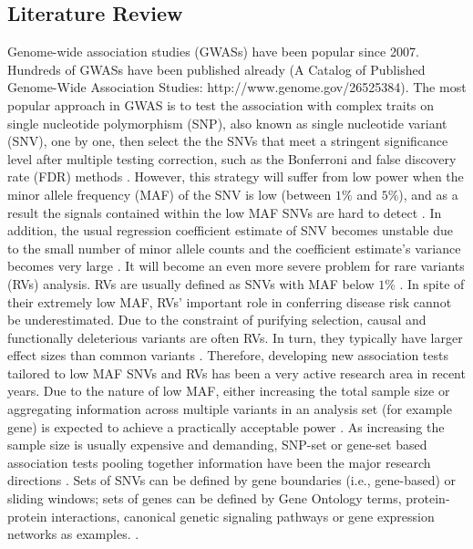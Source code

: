 \documentclass[12pt]{article}
\begin{document}
\subsection{Literature Review}\label{Lit_Rev}
\doublespacing
Genome-wide association studies (GWASs) have been popular since 2007. Hundreds of GWASs have been published already (A Catalog of Published Genome-Wide Association Studies: http://www.genome.gov/26525384). The most popular approach in GWAS is to test the association with complex traits on single nucleotide polymorphism (SNP), also known as single nucleotide variant (SNV), one by one, then select the the SNVs that meet a stringent significance level after multiple testing correction, such as the Bonferroni and false discovery rate (FDR) methods \cite{McCarthy2008,Hirschhorn2005}. However, this strategy will suffer from low power when the minor allele frequency (MAF) of the SNV is low (between $1\%$ and $5\%$), and as a result the signals contained within the low MAF SNVs are hard to detect \cite{Sham2014}. In addition, the usual regression coefficient estimate of SNV becomes unstable due to the small number of minor allele counts and the coefficient estimate's variance becomes very large \cite{Sham2014}. It will become an even more severe problem for rare variants (RVs) analysis. RVs are usually defined as SNVs with MAF below $1\%$ \cite{Bansal2010}. In spite of their extremely low MAF, RVs' important role in conferring disease risk cannot be underestimated. Due to the constraint of purifying selection, causal and functionally deleterious variants are often RVs. In turn, they typically have larger effect sizes than common variants \cite{Fu2013,Bansal2010,Sham2014,McCarthy2008}. Therefore, developing new association tests tailored to low MAF SNVs and RVs has been a very active research area in recent years. Due to the nature of low MAF, either increasing the total sample size or aggregating information across multiple variants in an analysis set (for example gene) is expected to achieve a practically acceptable power \cite{Capanu2011,Basu2011,Bansal2010,Sham2014}. As increasing the sample size is usually expensive and demanding, SNP-set or gene-set based association tests pooling together information have been the major research directions \cite{Ye2011,Pinto2010,Sham2014}. Sets of SNVs can be defined by gene boundaries (i.e., gene-based) or sliding windows; sets of genes can be defined by Gene Ontology terms, protein-protein interactions, canonical genetic signaling pathways or gene expression networks as examples. \cite{Sham2014,DelaCruz2010,Weng2011,Wang2010,Wei2012a}.
\end{document}
